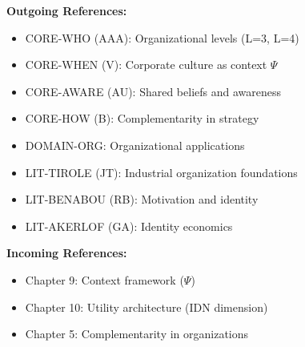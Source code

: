 \begin{tcolorbox}[colback=gray!5!white, colframe=gray!75!black, title=Cross-Reference Map]
\textbf{Outgoing References:}
\begin{itemize}[nosep]
    \item CORE-WHO (AAA): Organizational levels (L=3, L=4)
    \item CORE-WHEN (V): Corporate culture as context $\Psi$
    \item CORE-AWARE (AU): Shared beliefs and awareness
    \item CORE-HOW (B): Complementarity in strategy
    \item DOMAIN-ORG: Organizational applications
    \item LIT-TIROLE (JT): Industrial organization foundations
    \item LIT-BENABOU (RB): Motivation and identity
    \item LIT-AKERLOF (GA): Identity economics
\end{itemize}

\textbf{Incoming References:}
\begin{itemize}[nosep]
    \item Chapter 9: Context framework ($\Psi$)
    \item Chapter 10: Utility architecture (IDN dimension)
    \item Chapter 5: Complementarity in organizations
\end{itemize}
\end{tcolorbox}


